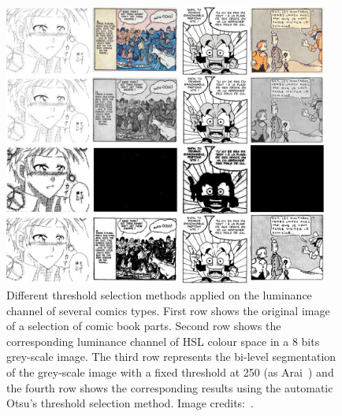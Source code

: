 	\begin{figure}[h!]	%
	  \centering
		\includegraphics[trim= 0px 0px 0px 0px, clip, width=0.95\textwidth]{threshold_selection.jpg}
		\caption[Different threshold selection applied on a grey-scale image]{Different threshold selection methods applied on the luminance channel of several comics types. First row shows the original image of a selection of comic book parts. Second row shows the corresponding luminance channel of HSL colour space in a 8 bits grey-scale image. The third row represents the bi-level segmentation of the grey-scale image with a fixed threshold at 250 (as Arai~\cite{Arai11}) and the fourth row shows the corresponding results using the automatic Otsu's threshold selection method. Image credits:~\cite{Inoue08,McCall46,Bubble09,Zig52}. }
		\label{fig:in:threshold_selection_methods}
	\end{figure}





